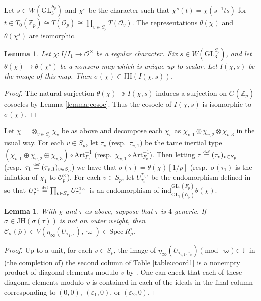\documentclass[oneside,a4paper,english, 11pt]{amsart}
\theoremstyle{plain}
\theoremstyle{plain}
\theoremstyle{plain}
\newtheorem{lemma}[thm]{Lemma}
\theoremstyle{plain}
\theoremstyle{plain}
\theoremstyle{plain}
\theoremstyle{definition}
\theoremstyle{definition}
\theoremstyle{definition}
\theoremstyle{remark}
\numberwithin{equation}{section}
\newcommand{\Z}{\mathbb{Z}}
\newcommand{\F}{\mathbb{F}}
\newcommand{\cC}{\mathcal{C}}
\newcommand{\cO}{\mathcal{O}}
\newcommand{\eps}{\varepsilon}
\newcommand{\ind}{\mathrm{ind}}
\newcommand{\GL}{\mathrm{GL}}
\newcommand{\Spec}{\mathrm{Spec}\ }
\newcommand{\JH}{\mathrm{JH}}
\newcommand{\rhobar}{\overline{\rho}}
\newcommand{\defeq}{\stackrel{\textrm{\tiny{def}}}{=}}
\newcommand{\ovl}[1]{\overline{#1}}
\newcommand{\ra}{\rightarrow}
\newcommand{\onto}{\twoheadrightarrow}
\begin{document}
%
Let $s \in W(\GL_3^{S_p})$ and $\chi^s$ be the character such that $\chi^s(t) = \chi({s}^{-1}t{s})$ for $t \in T_0(\Z_p) \cong T(\cO_p) \cong \prod_{v\in S_p} T(\cO_v)$. 
The representations $\theta(\chi)$ and $\theta(\chi^s)$ are isomorphic. 

\begin{lemma}\label{lemma:image}
Let $\chi: I/I_1 \ra \cO^\times$ be a regular character. 
%
Fix $s \in W(\GL_3^{S_p})$, and let $\theta(\chi) \ra \ovl{\theta(\chi^s)}$ be a nonzero map which is unique up to scalar. 
Let $I(\chi,s)$ be the image of this map. 
Then $\sigma(\chi) \in \JH(I(\chi,s))$.
\end{lemma}
\begin{proof}
The natural surjection $\theta(\chi) \onto I(\chi,s)$ induces a surjection on $G(\Z_p)$-cosocles by Lemma \ref{lemma:cosoc}. 
Thus the cosocle of $I(\chi,s)$ is isomorphic to $\sigma(\chi)$. 
\end{proof}

Let $\chi = \otimes_{v\in S_p} \chi_v$ be as above and decompose each $\chi_v$ as $\chi_{v,1} \otimes \chi_{v,2} \otimes \chi_{v,3}$ in the usual way. 
For each $v\in S_p$, let $\tau_v$ (resp.~$\tau_{v,1}$) be the tame inertial type $(\chi_{v,1} \oplus \chi_{v,2} \oplus \chi_{v,3}) \circ \mathrm{Art}_{F_v}^{-1}$ (resp.~$\chi_{v,1} \circ \mathrm{Art}_{F_v}^{-1}$). 
Then letting $\tau \defeq (\tau_v)_{v\in S_p}$ (resp.~$\tau_1 \defeq (\tau_{v,1})_{v\in S_p}$) we have that $\sigma(\tau) = \theta(\chi)[1/p]$ (resp.~$\sigma(\tau_1)$ is the inflation of $\chi_1$ to $\cO_p^\times$).
For each $v\in S_p$, let $U^{\tau_{1,v}}_{\tau_v}$ be the endomorphism defined in \cite[\S 10.1.2]{LGC} so that $U^{\tau_1}_\tau\defeq \prod_{v\in S_p} U^{\tau_{1,v}}_{\tau_v}$ is an endomorphism of $\ind_{\GL_3(\cO_p)}^{\GL_3(F_p)} \theta(\chi)$. 

\begin{lemma}\label{lemma:outer}
With $\chi$ and $\tau$ as above, suppose that $\tau$ is $4$-generic. 
If $\sigma\in \JH(\ovl{\sigma}(\tau))$ is not an outer weight, then $\cC_{\sigma}(\rhobar) \in V(\eta_\infty(U_{\tau_1,\tau}),\varpi) \in \Spec R_{\rhobar}^\tau$.
%
\end{lemma}
\begin{proof}
Up to a unit, for each $v\in S_p$, the image of $\eta_\infty(U_{\tau_{v,1},\tau_v}) \pmod{\varpi} \in \F$ in (the completion of) the second column of Table \ref{table:coord1} is a nonempty product of diagonal elements modulo $v$ by \cite[Corollary 3.7]{DL}. 
One can check that each of these diagonal elements modulo $v$ is contained in each of the ideals in the final column corresponding to $(0,0)$, $(\eps_1,0)$, or $(\eps_2,0)$. 
\end{proof}
\end{document}
